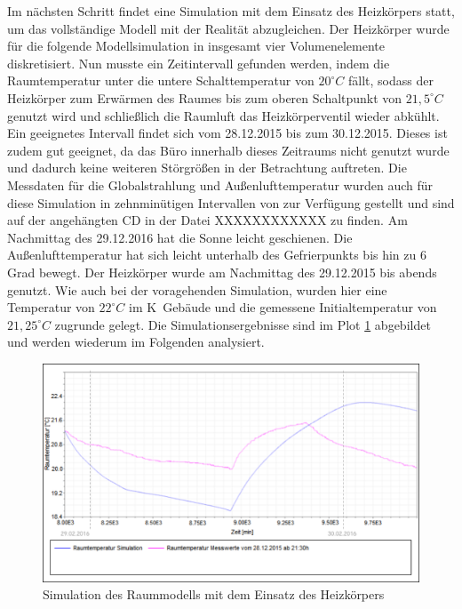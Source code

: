 Im nächsten Schritt findet eine Simulation mit dem Einsatz des Heizkörpers statt, um das vollständige Modell mit der Realität abzugleichen. Der Heizkörper wurde für die folgende Modellsimulation in insgesamt vier Volumenelemente diskretisiert.
Nun musste ein Zeitintervall gefunden werden, indem die Raumtemperatur unter die untere Schalttemperatur von $20^{\circ}C$ fällt, sodass der Heizkörper zum Erwärmen des Raumes bis zum oberen Schaltpunkt von $21,5^{\circ}C$ genutzt wird und  schließlich die Raumluft das Heizkörperventil wieder abkühlt. Ein geeignetes Intervall findet sich vom 28.12.2015 bis zum 30.12.2015. Dieses ist zudem gut geeignet, da das Büro innerhalb dieses Zeitraums nicht genutzt wurde und dadurch keine weiteren Störgrößen in der Betrachtung auftreten.
Die Messdaten für die Globalstrahlung und Außenlufttemperatur wurden auch für diese Simulation in zehnminütigen Intervallen von \cite{wetter} zur Verfügung gestellt und sind auf der angehängten CD in der Datei XXXXXXXXXXXX zu finden. Am Nachmittag des 29.12.2016 hat die Sonne leicht geschienen. Die Außenlufttemperatur hat sich leicht unterhalb des Gefrierpunkts bis hin zu 6 Grad bewegt. Der Heizkörper wurde am Nachmittag des 29.12.2015 bis abends genutzt.
Wie auch bei der voragehenden Simulation, wurden hier eine Temperatur von $22^{\circ}C$ im K~Gebäude und die gemessene Initialtemperatur von $21,25^{\circ}C$ zugrunde gelegt. Die Simulationsergebnisse sind im Plot \ref{fig:valid2} abgebildet und werden wiederum im Folgenden analysiert.

\begin{figure}
\centering
\includegraphics[width=\textwidth]{abbildungen/20160328_validierung2}
\caption{Simulation des Raummodells mit dem Einsatz des Heizkörpers}
\label{fig:valid2}
\end{figure}

